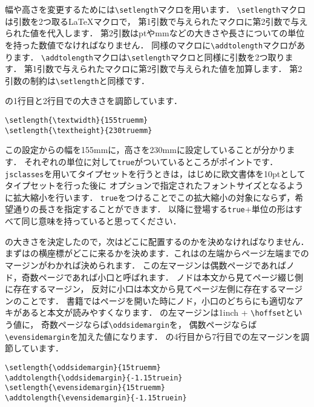 幅や高さを変更するためには\verb|\setlength|マクロを用います．
\verb|\setlength|マクロは引数を2つ取る{\LaTeX}マクロで，
第1引数で与えられたマクロに第2引数で与えられた値を代入します．
第2引数はptやmmなどの大きさや長さについての単位を持った数値でなければなりません．
同様のマクロに\verb|\addtolength|マクロがあります．
\verb|\addtolength|マクロは\verb|\setlength|マクロと同様に引数を2つ取ります．
第1引数で与えられたマクロに第2引数で与えられた値を加算します．
第2引数の制約は\verb|\setlength|と同様です．

の1行目と2行目での大きさを調節しています．
\begin{verbatim}
\setlength{\textwidth}{155truemm}
\setlength{\textheight}{230truemm}
\end{verbatim}

この設定からの幅を155mmに，高さを230mmに設定していることが分かります．
それぞれの単位に対して\texttt{true}がついているところがポイントです．
\texttt{jsclasses}を用いてタイプセットを行うときは，はじめに欧文書体を10ptとしてタイプセットを行った後に
オプションで指定されたフォントサイズとなるように拡大縮小を行います．
\texttt{true}をつけることでこの拡大縮小の対象にならず，希望通りの長さを指定することができます．
以降に登場する\texttt{true}+単位の形はすべて同じ意味を持っていると思ってください．

の大きさを決定したので，次はどこに配置するのかを決めなければなりません．
まずはの横座標がどこに来るかを決めます．これはの左端からページ左端までのマージンがわかれば決められます．
この左マージンは偶数ページであればノド，奇数ページであれば小口と呼ばれます．
ノドは本文から見てページ綴じ側に存在するマージン，
反対に小口は本文から見てページ左側に存在するマージンのことです．
書籍ではページを開いた時にノド，小口のどちらにも適切なアキがあると本文が読みやすくなります．
の左マージンは1inch + \verb|\hoffset|という値に，
奇数ページならば\verb|\oddsidemargin|を，
偶数ページならば\verb|\evensidemargin|を加えた値になります．
の4行目から7行目での左マージンを調節しています．

\begin{verbatim}
\setlength{\oddsidemargin}{15truemm}
\addtolength{\oddsidemargin}{-1.15truein}
\setlength{\evensidemargin}{15truemm}
\addtolength{\evensidemargin}{-1.15truein}
\end{verbatim}

